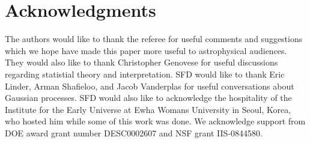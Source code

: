 \documentclass[useAMS,usenatbib]{aastex}
\begin{document}
\section*{Acknowledgments}
The authors would like to thank the referee for useful comments and suggestions
which we hope have made this paper more useful to astrophysical audiences.
They would also like to thank Christopher Genovese for useful discussions
regarding statistial theory and interpretation.
SFD would like to thank Eric Linder, Arman Shafieloo, and Jacob Vanderplas 
for useful conversations
about Gaussian processes.  SFD would also like to acknowledge the hospitality of
the Institute for the Early Universe at Ewha Womans University in 
Seoul, Korea, who
hosted him while some of this work was done.
We acknowledge support from DOE award grant number DESC0002607 and NSF grant
IIS-0844580.
\end{document}
